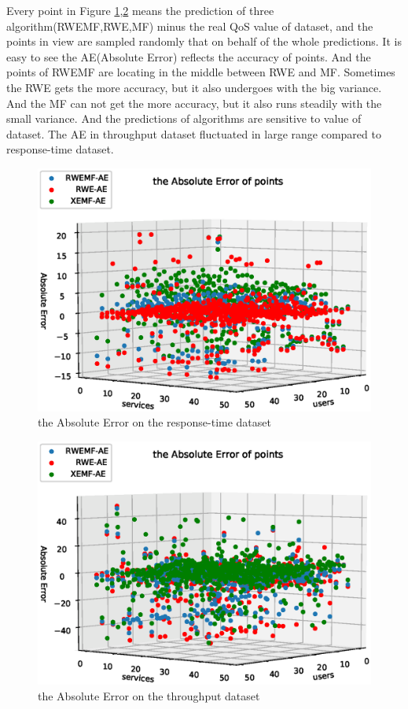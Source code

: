 \documentclass[conference]{IEEEtran}
\begin{document}
\par Every point in Figure \ref{fig_ae_rt},\ref{fig_ae_tp} means the prediction of three algorithm(RWEMF,RWE,MF) minus the real QoS value of dataset, and the points in view are sampled randomly that on behalf of the whole predictions. It is easy to see the AE(Absolute Error) reflects the accuracy of points. And the points of RWEMF are locating in the middle between RWE and MF. Sometimes the RWE gets the more accuracy, but it also undergoes with the big variance. And the MF can not get the more accuracy, but it also runs steadily with the small variance. And the predictions of algorithms are sensitive to value of dataset. The AE in throughput dataset fluctuated in large range compared to response-time dataset.

\begin{figure}[H] 
\centering  
\includegraphics[width=0.45\paperwidth]{ae_rt.eps}  
\caption{the Absolute Error on the response-time dataset }  
\label{fig_ae_rt}  
\end{figure} 

\begin{figure}[H] 
\centering  
\includegraphics[width=0.45\paperwidth]{ae_tp.eps}  
\caption{the Absolute Error on the throughput dataset }  
\label{fig_ae_tp}  
\end{figure} 
\end{document}
